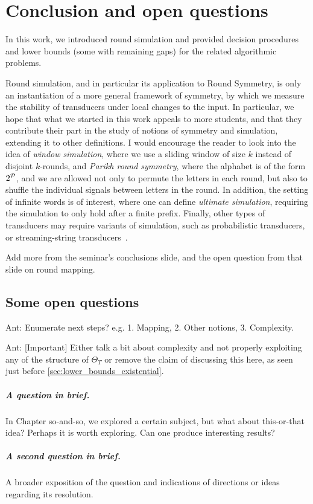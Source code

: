 \chapter{Conclusion and open questions}
\label{chap:conclusion}
\label{chap:discussion}
\label{chap:future}

In this work, we introduced round simulation and provided decision procedures and lower bounds (some with remaining gaps) for the related algorithmic problems.

Round simulation, and in particular its application to Round Symmetry, is only an instantiation of a more general framework of symmetry, by which we measure the stability of transducers under local changes to the input. In particular, we hope that what we started in this work appeals to more students, and that they contribute their part in the study of notions of symmetry and simulation, extending it to other definitions. I would encourage the reader to look into the idea of \emph{window simulation}, where we use a sliding window of size $k$ instead of disjoint $k$-rounds, and \emph{Parikh round symmetry}, where the alphabet is of the form $2^{\mathcal{P}}$, and we are allowed not only to permute the letters in each round, but also to shuffle the individual signals between letters in the round. 
In addition, the setting of infinite words is of interest, where one can define \emph{ultimate simulation}, requiring the simulation to only hold after a finite prefix. 
Finally, other types of transducers may require variants of simulation, such as probabilistic transducers, or streaming-string transducers~\cite{Alur2010}.

Add more from the seminar's conclusions slide, and the open question from that slide on round mapping.

\section{Some open questions}

Ant: Enumerate next steps? e.g. 1. Mapping, 2. Other notions, 3. Complexity.

Ant: [Important] Either talk a bit about complexity and not properly exploiting any of the structure of $\Theta_T$ or remove the claim of discussing this here, as seen just before \autoref{sec:lower_bounds_existential}.

\paragraph{A question in brief.} In Chapter so-and-so, we explored a certain subject, but what about this-or-that idea? Perhaps it is worth exploring. Can one produce interesting results?

\paragraph{A second question in brief.} A broader exposition of the question and indications of directions or ideas regarding its resolution.
